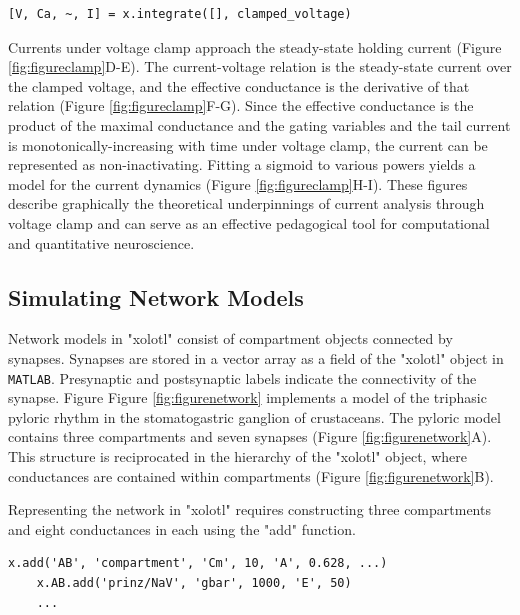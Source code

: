 \documentclass{frontiersSCNS} %
\begin{document}
\begin{lstlisting}[style=Matlab-editor]
	[V, Ca, ~, I] = x.integrate([], clamped_voltage)
\end{lstlisting}

Currents under voltage clamp approach the steady-state holding current (Figure \ref{fig:figureclamp}D-E). The current-voltage relation is the steady-state current over the clamped voltage, and the effective conductance is the derivative of that relation (Figure \ref{fig:figureclamp}F-G). Since the effective conductance is the product of the maximal conductance and the gating variables \autocite{dayanTheoreticalNeuroscience2001, turrigianoSelectiveRegulationCurrent1995} and the tail current is monotonically-increasing with time under voltage clamp, the current can be represented as non-inactivating. Fitting a sigmoid to various powers yields a model for the current dynamics (Figure \ref{fig:figureclamp}H-I). These figures describe graphically the theoretical underpinnings of current analysis through voltage clamp and can serve as an effective pedagogical tool for computational and quantitative neuroscience.

%
%
%
%
%
%

\subsection{Simulating Network Models}

Network models in "xolotl" consist of compartment objects connected by synapses. Synapses are stored in a vector array as a field of the "xolotl" object in \texttt{MATLAB}. Presynaptic and postsynaptic labels indicate the connectivity of the synapse. Figure Figure \ref{fig:figurenetwork} implements a model of the triphasic pyloric rhythm in the stomatogastric ganglion of crustaceans. The pyloric model contains three compartments and seven synapses (Figure \ref{fig:figurenetwork}A). This structure is reciprocated in the hierarchy of the "xolotl" object, where conductances are contained within compartments (Figure \ref{fig:figurenetwork}B).

Representing the network in "xolotl" requires constructing three compartments and eight conductances in each using the "add" function. 

\begin{lstlisting}[style=Matlab-editor]
	x.add('AB', 'compartment', 'Cm', 10, 'A', 0.628, ...)
	x.AB.add('prinz/NaV', 'gbar', 1000, 'E', 50)
	...
\end{lstlisting}
\end{document}

